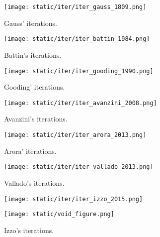 \begin{figure}[H]
  \begin{minipage}{0.48\textwidth}
    \centering
    \texttt{[image: static/iter/iter\_gauss\_1809.png]}
    \caption{Gauss' iterations.}\label{fig:iter_gauss}
  \end{minipage}\hfill
  \begin{minipage}{0.48\textwidth}
    \centering
    \texttt{[image: static/iter/iter\_battin\_1984.png]}
    \caption{Battin's iterations.}\label{fig:iter_battin}
  \end{minipage}
\end{figure}

\begin{figure}[H]
  \begin{minipage}{0.48\textwidth}
    \centering
    \texttt{[image: static/iter/iter\_gooding\_1990.png]}
    \caption{Gooding' iterations.}\label{fig:iter_gooding}
  \end{minipage}\hfill
  \begin{minipage}{0.48\textwidth}
    \centering
    \texttt{[image: static/iter/iter\_avanzini\_2008.png]}
    \caption{Avanzini's iterations.}\label{fig:iter_avanzini}
  \end{minipage}
\end{figure}

\begin{figure}[H]
  \begin{minipage}{0.48\textwidth}
    \centering
    \texttt{[image: static/iter/iter\_arora\_2013.png]}
    \caption{Arora' iterations.}\label{fig:iter_arora}
  \end{minipage}\hfill
  \begin{minipage}{0.48\textwidth}
    \centering
    \texttt{[image: static/iter/iter\_vallado\_2013.png]}
    \caption{Vallado's iterations.}\label{fig:iter_vallado}
  \end{minipage}
\end{figure}

\begin{figure}[H]
  \begin{minipage}{0.48\textwidth}
    \centering
    \texttt{[image: static/iter/iter\_izzo\_2015.png]}
    \caption{Izzo's iterations.}\label{fig:iter_izzo}
  \end{minipage}\hfill
  \begin{minipage}{0.48\textwidth}
    \centering
    \texttt{[image: static/void\_figure.png]}
  \end{minipage}
\end{figure}


